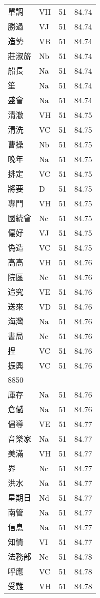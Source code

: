 \documentclass[twocolumn]{book}
\begin{document}
\begin{supertabular}{llrr}
單調 & VH & 51 &  84.74\\
勝過 & VJ & 51 &  84.74\\
造勢 & VB & 51 &  84.74\\
莊淑旂 & Nb & 51 &  84.74\\
船長 & Na & 51 &  84.74\\
笙 & Na & 51 &  84.74\\
盛會 & Na & 51 &  84.74\\
清澈 & VH & 51 &  84.75\\
清洗 & VC & 51 &  84.75\\
曹操 & Nb & 51 &  84.75\\
晚年 & Na & 51 &  84.75\\
排定 & VC & 51 &  84.75\\
將要 & D & 51 &  84.75\\
專門 & VH & 51 &  84.75\\
國統會 & Nc & 51 &  84.75\\
偏好 & VJ & 51 &  84.75\\
偽造 & VC & 51 &  84.75\\
高高 & VH & 51 &  84.76\\
院區 & Nc & 51 &  84.76\\
追究 & VE & 51 &  84.76\\
送來 & VD & 51 &  84.76\\
海灣 & Na & 51 &  84.76\\
書局 & Nc & 51 &  84.76\\
捏 & VC & 51 &  84.76\\
振興 & VC & 51 &  84.76\\
8850\\
庫存 & Na & 51 &  84.76\\
倉儲 & Na & 51 &  84.76\\
倡導 & VE & 51 &  84.77\\
音樂家 & Na & 51 &  84.77\\
美滿 & VH & 51 &  84.77\\
界 & Nc & 51 &  84.77\\
洪水 & Na & 51 &  84.77\\
星期日 & Nd & 51 &  84.77\\
南管 & Na & 51 &  84.77\\
信息 & Na & 51 &  84.77\\
知情 & VI & 51 &  84.77\\
法務部 & Nc & 51 &  84.78\\
呼應 & VC & 51 &  84.78\\
受難 & VH & 51 &  84.78\\

\end{supertabular}
\end{document}
